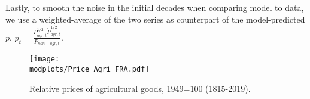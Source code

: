 \documentclass[11pt]{report}
\newcommand{\round}{revision3}  %
\newcommand{\modplots}{../../output/model/plots/\round}
\begin{document}
Lastly, to smooth the noise in the initial decades when comparing model to data, we use a weighted-average of the two series as counterpart of the model-predicted $p$, $p_t=\frac{P_{agr,t}^{1/2}\tilde{P}_{agr,t}^{1/2}}{P_{non-agr,t}}$.

\begin{figure}
	\begin{center}
		\texttt{[image: \\modplots/Price\_Agri\_FRA.pdf]}
	\end{center}
	\vspace{-0.5cm}
	\caption{Relative prices of agricultural goods, 1949=100 (1815-2019).}
	\label{A-fig:relpriceagri}
\end{figure}

\end{document}
